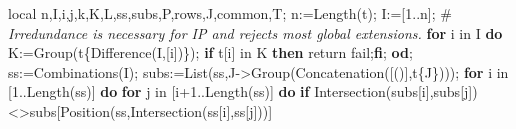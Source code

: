 \documentclass[
  10pt,
  letterpaper,
]{article}
\newenvironment{Shaded}{}{}
\newcommand{\BuiltInTok}[1]{\textcolor[rgb]{0.00,0.50,0.00}{#1}}
\newcommand{\CommentTok}[1]{\textcolor[rgb]{0.38,0.63,0.69}{\textit{#1}}}
\newcommand{\ConstantTok}[1]{\textcolor[rgb]{0.53,0.00,0.00}{#1}}
\newcommand{\ControlFlowTok}[1]{\textcolor[rgb]{0.00,0.44,0.13}{\textbf{#1}}}
\newcommand{\ExtensionTok}[1]{#1}
\newcommand{\FloatTok}[1]{\textcolor[rgb]{0.25,0.63,0.44}{#1}}
\newcommand{\NormalTok}[1]{#1}
\newcommand{\OperatorTok}[1]{\textcolor[rgb]{0.40,0.40,0.40}{#1}}
\newcommand{\VariableTok}[1]{\textcolor[rgb]{0.10,0.09,0.49}{#1}}
\begin{document}
\begin{Shaded}
\begin{Highlighting}[]
 \ExtensionTok{local} \VariableTok{n}\OperatorTok{,}\VariableTok{I}\OperatorTok{,}\VariableTok{i}\OperatorTok{,}\VariableTok{j}\OperatorTok{,}\VariableTok{k}\OperatorTok{,}\VariableTok{K}\OperatorTok{,}\VariableTok{L}\OperatorTok{,}\VariableTok{ss}\OperatorTok{,}\VariableTok{subs}\OperatorTok{,}\VariableTok{P}\OperatorTok{,}\VariableTok{rows}\OperatorTok{,}\VariableTok{J}\OperatorTok{,}\VariableTok{common}\OperatorTok{,}\VariableTok{T}\OperatorTok{;}
 \VariableTok{n}\OperatorTok{:=}\BuiltInTok{Length}\NormalTok{(}\VariableTok{t}\NormalTok{)}\OperatorTok{;} \VariableTok{I}\OperatorTok{:=}\NormalTok{[}\FloatTok{1}\OperatorTok{..}\VariableTok{n}\NormalTok{]}\OperatorTok{;}
\NormalTok{ \#}\CommentTok{ Irredundance is necessary for IP and rejects most global extensions.}
 \ControlFlowTok{for} \VariableTok{i} \ExtensionTok{in} \VariableTok{I} \ControlFlowTok{do}
  \VariableTok{K}\OperatorTok{:=}\BuiltInTok{Group}\NormalTok{(}\VariableTok{t}\NormalTok{\{}\BuiltInTok{Difference}\NormalTok{(}\VariableTok{I}\OperatorTok{,}\NormalTok{[}\VariableTok{i}\NormalTok{])\})}\OperatorTok{;}
  \ControlFlowTok{if} \VariableTok{t}\NormalTok{[}\VariableTok{i}\NormalTok{] }\ExtensionTok{in} \VariableTok{K} \ControlFlowTok{then} \ExtensionTok{return} \ConstantTok{fail}\OperatorTok{;}\ControlFlowTok{fi}\OperatorTok{;}
 \ControlFlowTok{od}\OperatorTok{;}
 \VariableTok{ss}\OperatorTok{:=}\BuiltInTok{Combinations}\NormalTok{(}\VariableTok{I}\NormalTok{)}\OperatorTok{;}
 \VariableTok{subs}\OperatorTok{:=}\BuiltInTok{List}\NormalTok{(}\VariableTok{ss}\OperatorTok{,}\VariableTok{J}\OperatorTok{{-}\textgreater{}}\BuiltInTok{Group}\NormalTok{(}\BuiltInTok{Concatenation}\NormalTok{([()]}\OperatorTok{,}\VariableTok{t}\NormalTok{\{}\VariableTok{J}\NormalTok{\})))}\OperatorTok{;}
 \ControlFlowTok{for} \VariableTok{i} \ExtensionTok{in}\NormalTok{ [}\FloatTok{1}\OperatorTok{..}\BuiltInTok{Length}\NormalTok{(}\VariableTok{ss}\NormalTok{)] }\ControlFlowTok{do} \ControlFlowTok{for} \VariableTok{j} \ExtensionTok{in}\NormalTok{ [}\VariableTok{i}\OperatorTok{+}\FloatTok{1}\OperatorTok{..}\BuiltInTok{Length}\NormalTok{(}\VariableTok{ss}\NormalTok{)] }\ControlFlowTok{do}
  \ControlFlowTok{if} \BuiltInTok{Intersection}\NormalTok{(}\VariableTok{subs}\NormalTok{[}\VariableTok{i}\NormalTok{]}\OperatorTok{,}\VariableTok{subs}\NormalTok{[}\VariableTok{j}\NormalTok{])}\OperatorTok{\textless{}\textgreater{}}\VariableTok{subs}\NormalTok{[}\BuiltInTok{Position}\NormalTok{(}\VariableTok{ss}\OperatorTok{,}\BuiltInTok{Intersection}\NormalTok{(}\VariableTok{ss}\NormalTok{[}\VariableTok{i}\NormalTok{]}\OperatorTok{,}\VariableTok{ss}\NormalTok{[}\VariableTok{j}\NormalTok{]))]}

\end{Highlighting}
\end{Shaded}
\end{document}
